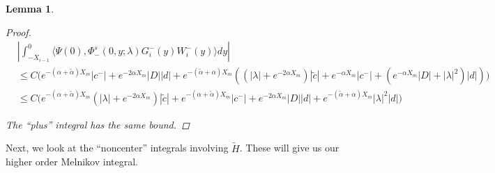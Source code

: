 \documentclass[12pt]{article}
\newtheorem{lemma}{Lemma}
\begin{document}
\begin{lemma}
\begin{proof}
\begin{align*}
&\left| \int_{-X_{i-1}}^0 \langle \Psi(0), \Phi^s_-(0, y; \lambda) G_i^-(y) W_i^-(y) \rangle dy \right| \\
&\leq C \Big( e^{-(\alpha + \tilde{\alpha}) X_m} |c^-| + e^{-2 \alpha X_m} |D||d| + e^{-(\tilde{\alpha} + \alpha) X_m} ( (|\lambda| + e^{-2 \alpha X_m}) |\tilde{c}| + e^{-\alpha X_m} |c^-| + (e^{-\alpha X_m}|D| + |\lambda|^2) |d| ) \Big) \\
&\leq C \Big( e^{-(\alpha + \tilde{\alpha}) X_m} (|\lambda| + e^{-2 \alpha X_m}) |\tilde{c}| + e^{-(\alpha + \tilde{\alpha}) X_m} |c^-| + e^{-2 \alpha X_m} |D||d| + e^{-(\tilde{\alpha} + \alpha) X_m} |\lambda|^2 |d| \Big)
\end{align*}

The ``plus'' integral has the same bound.

\end{proof}
\end{lemma}

Next, we look at the ``noncenter'' integrals involving $\tilde{H}$. These will give us our higher order Melnikov integral.

\end{document}
